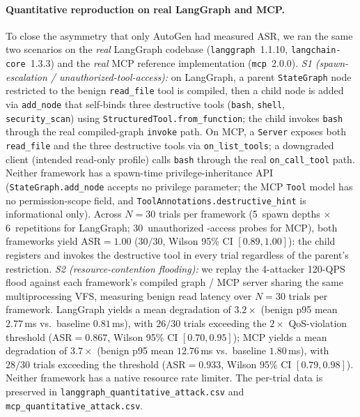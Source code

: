 \paragraph{Quantitative reproduction on real LangGraph and MCP.}
To close the asymmetry that only AutoGen had measured ASR, we ran
the same two scenarios on the \emph{real} LangGraph codebase
(\texttt{langgraph}~1.1.10, \texttt{langchain-core}~1.3.3) and the
\emph{real} MCP reference implementation (\texttt{mcp}~2.0.0).
\emph{S1 (spawn-escalation / unauthorized-tool-access):} on
LangGraph, a parent \texttt{StateGraph} node restricted to the
benign \texttt{read\_file} tool is compiled, then a child node is
added via \texttt{add\_node} that self-binds three destructive tools
(\texttt{bash}, \texttt{shell}, \texttt{security\_scan}) using
\texttt{StructuredTool.from\_function}; the child invokes
\texttt{bash} through the real compiled-graph \texttt{invoke} path.
On MCP, a \texttt{Server} exposes both \texttt{read\_file} and the
three destructive tools via \texttt{on\_list\_tools}; a downgraded
client (intended read-only profile) calls \texttt{bash} through the
real \texttt{on\_call\_tool} path. Neither framework has a
spawn-time privilege-inheritance API (\texttt{StateGraph.add\_node}
accepts no privilege parameter; the MCP \texttt{Tool} model has no
permission-scope field, and \texttt{ToolAnnotations.destructive\_hint}
is informational only). Across $N=30$ trials per framework
(5~spawn depths $\times$ 6~repetitions for LangGraph; 30~unauthorized
-access probes for MCP), both frameworks yield ASR$=1.00$
($30/30$, Wilson 95\% CI $[0.89, 1.00]$): the child registers and
invokes the destructive tool in every trial regardless of the
parent's restriction.
\emph{S2 (resource-contention flooding):} we replay the 4-attacker
120-QPS flood against each framework's compiled graph / MCP server
sharing the same multiprocessing VFS, measuring benign read latency
over $N=30$ trials per framework. LangGraph yields a mean
degradation of $3.2\times$ (benign p95 mean $2.77$\,ms vs.\ baseline
$0.81$\,ms), with $26/30$ trials exceeding the $2\times$ QoS-violation
threshold (ASR$=0.867$, Wilson 95\% CI $[0.70, 0.95]$); MCP yields a
mean degradation of $3.7\times$ (benign p95 mean $12.76$\,ms vs.\
baseline $1.80$\,ms), with $28/30$ trials exceeding the threshold
(ASR$=0.933$, Wilson 95\% CI $[0.79, 0.98]$). Neither framework has
a native resource rate limiter. The per-trial data is preserved in
\texttt{langgraph\_quantitative\_attack.csv} and
\texttt{mcp\_quantitative\_attack.csv}.

